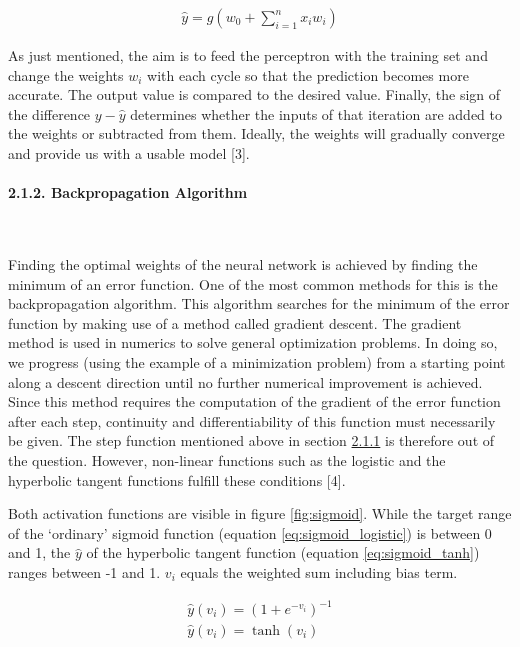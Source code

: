 \documentclass[
]{article}
\begin{document}
\begin{align} \label{eq:perceptron}
\hat{y}=g(w_{0}+\sum_{i=1}^{n}x_{i}w_{i})
\end{align}

As just mentioned, the aim is to feed the perceptron with the training
set and change the weights \(w_{i}\) with each cycle so that the
prediction becomes more accurate. The output value is compared to the
desired value. Finally, the sign of the difference \(y-\hat{y}\)
determines whether the inputs of that iteration are added to the weights
or subtracted from them. Ideally, the weights will gradually converge
and provide us with a usable model {[}3{]}.

\newpage

\hypertarget{backprogation_algorithm}{%
\paragraph{2.1.2. Backpropagation
Algorithm}\label{backprogation_algorithm}}

~

Finding the optimal weights of the neural network is achieved by finding
the minimum of an error function. One of the most common methods for
this is the backpropagation algorithm. This algorithm searches for the
minimum of the error function by making use of a method called gradient
descent. The gradient method is used in numerics to solve general
optimization problems. In doing so, we progress (using the example of a
minimization problem) from a starting point along a descent direction
until no further numerical improvement is achieved. Since this method
requires the computation of the gradient of the error function after
each step, continuity and differentiability of this function must
necessarily be given. The step function mentioned above in section
\protect\hyperlink{perceptron}{2.1.1} is therefore out of the question.
However, non-linear functions such as the logistic and the hyperbolic
tangent functions fulfill these conditions {[}4{]}.

Both activation functions are visible in figure \ref{fig:sigmoid}. While
the target range of the `ordinary' sigmoid function (equation
\ref{eq:sigmoid_logistic}) is between 0 and 1, the \(\hat{y}\) of the
hyperbolic tangent function (equation \ref{eq:sigmoid_tanh}) ranges
between -1 and 1. \(v_{i}\) equals the weighted sum including bias term.

\begin{eqnarray}
\hat{y}(v_{i})=(1+e^{-v_{i}})^{-1} \label{eq:sigmoid_logistic} \\
\hat{y}(v_{i})=\tanh(v_{i}) \label{eq:sigmoid_tanh}
\end{eqnarray}
\end{document}
